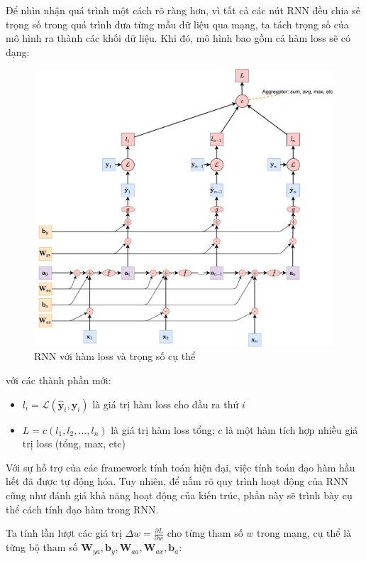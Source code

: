 Để nhìn nhận quá trình một cách rõ ràng hơn, vì tất cả các nút RNN đều chia sẻ trọng số trong quá trình đưa từng mẫu dữ liệu qua mạng, ta tách trọng số của mô hình ra thành các khối dữ liệu. Khi đó, mô hình bao gồm cả hàm loss sẽ có dạng:
\begin{figure}[!h]
    \centering
    \includegraphics[width=\textwidth,height=\textheight,keepaspectratio]{chapter06/figure-sec2345/rnn_backprop.pdf}
    \caption{RNN với hàm loss và trọng số cụ thể}
\end{figure}

với các thành phần mới:
\begin{itemize}
    \item $l_i = \mathcal{L}(\hat{\bm{y}}_i, \bm{y}_i)$ là giá trị hàm loss cho đầu ra thứ $i$
    \item $L = c(l_1,l_2,...,l_n)$ là giá trị hàm loss tổng; $c$ là một hàm tích hợp nhiều giá trị loss (tổng, max, etc)
\end{itemize}

Với sự hỗ trợ của các framework tính toán hiện đại, việc tính toán đạo hàm hầu hết đã được tự động hóa. Tuy nhiên, để nắm rõ quy trình hoạt động của RNN cũng như đánh giá khả năng hoạt động của kiến trúc, phần này sẽ trình bày cụ thể cách tính đạo hàm trong RNN.

Ta tính lần lượt các giá trị $\Delta w = \frac{\partial L}{\partial w}$ cho từng tham số $w$ trong mạng, cụ thể là từng bộ tham số $\bm W_{ya}, \bm b_y, \bm W_{aa}, \bm W_{ax}, \bm b_a$:

